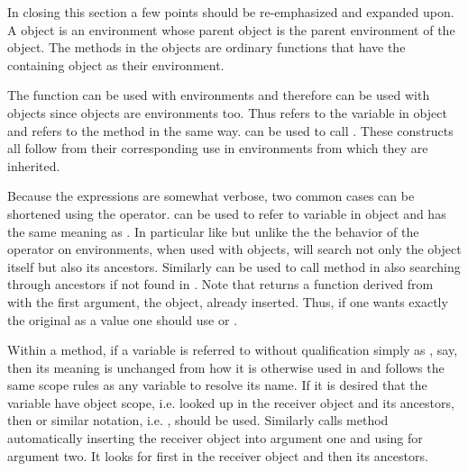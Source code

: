 \documentclass{Z}
\begin{document}
In closing this section a few points should be re-emphasized and 
expanded upon.  A
 object is an environment whose parent object is the
parent environment of the  object.  The methods in the 
objects are ordinary functions that have the containing object as their
environment.  

The   function can be used with environments and
therefore can be used with  objects since 
objects are environments too.  Thus  refers 
to the variable  in  object 
and  refers to the method 
in the same way.   can be used
to call .  These constructs all follow from their corresponding
use in environments from which they are inherited.

Because the  expressions are somewhat verbose, two common
cases can be shortened using the \code{\$} operator.  
can be used to refer to variable  in  object
 and has the same meaning as .  
In particular like  but 
unlike the the behavior of the \code{\$} operator on
environments, when used with  objects, \code{\$} will
search not only the object itself but also its ancestors.
Similarly  can be used to call
method  in  also searching through ancestors
if not found in .  Note that 
returns a function derived from  with the first argument,
the  object,
already inserted.  Thus, if one wants exactly the original 
as a value one should use  or 
.  

Within a method, if a variable is referred to without
qualification simply as , say, then  its meaning  is
unchanged from how it is otherwise used in  and
follows the same scope rules as any variable to resolve its name.  If it is
desired that the variable have object scope, i.e. looked up
in the receiver object and its ancestors, then 
or similar  notation, i.e. , should be used.  
Similarly  calls
method  automatically inserting the receiver object
into argument one and using  for argument two.  It
looks for  first in the receiver object and then its
ancestors.  
\end{document}
